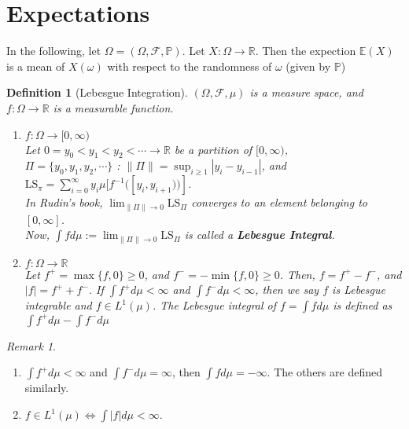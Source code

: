 \documentclass[12pt]{report}
\renewcommand{\1}{\mathbb{1}}
\theoremstyle{break}
\theoremstyle{newdef}
\newtheorem{defn}[thm]{Definition} %
\theoremstyle{remark}
\newtheorem*{rem}{Remark} %
\begin{document}
\section{Expectations}
In the following, let $\Omega = (\Omega, \mathcal{F}, \mathbb{P})$.
Let $X : \Omega \rightarrow \mathbb{R}$.
Then the expection $\mathbb{E}(X)$ is a mean of $X(\omega)$ with respect to the randomness of $\omega$ (given by $\mathbb{P}$)


\begin{defn}[Lebesgue Integration]
$(\Omega, \mathcal{F}, \mu)$ is a measure space, and $f : \Omega \rightarrow \mathbb{R}$ is a measurable function.
\begin{enumerate}[label = (\arabic*)]
\item $f : \Omega \rightarrow [0,\infty)$\\
Let $0 = y_0 < y_1 < y_2 < \cdots \rightarrow \mathbb{R}$ be a partition of $[0,\infty)$,\\
$\Pi = \{y_0, y_1, y_2, \cdots\}$ : $\|\Pi\| = \sup_{i\geq 1}|y_i-y_{i-1}|$, and\\
$\text{LS}_\pi = \sum_{i=0}^\infty y_i \mu[f^{-1}([y_i,y_{i+1}))]$.\\
In Rudin's book, $\lim_{\|\Pi\|\rightarrow 0} \text{LS}_\Pi$ converges to an element belonging to $[0,\infty]$.\\
Now, $\int fd\mu := \lim_{\|\Pi\|\rightarrow 0}\text{LS}_{\Pi}$ is called a \textbf{Lebesgue Integral}.

\item $f : \Omega \rightarrow \mathbb{R}$\\
Let $f^+ = \max\{f,0\} \geq 0$, and $f^- = -\min\{f,0\} \geq 0$.
Then, $f = f^+ - f^-$, and $|f| = f^+ + f^-$.
If $\int f^+d\mu < \infty$ and $\int f^- d\mu < \infty$, then we say $f$ is Lebesgue integrable and $f \in L^1(\mu)$.
The Lebesgue integral of $f = \int fd\mu$ is defined as $\int f^+ d\mu - \int f^- d\mu$
\end{enumerate}
\end{defn}

\begin{rem}
\leavevmode
\begin{enumerate}
\item $\int f^+ d\mu < \infty$ and $\int f^- d\mu = \infty$, then $\int fd\mu = -\infty$.
The others are defined similarly.
\item $f \in L^1(\mu) \Leftrightarrow \int |f|d\mu < \infty$.
\end{enumerate}
\end{rem}
\end{document}
